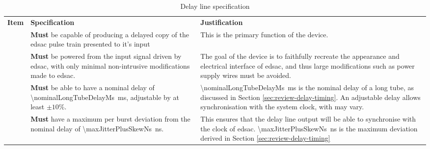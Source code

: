 \begin{longtable}{r  >{\raggedright}p{}  >{\raggedright}p{} }

	\caption{Delay line specification}\label{tbl:spec}\newcounter{specNo}\tabularnewline

	\toprule

	\bfseries Item & \bfseries Specification & \bfseries Justification \tabularnewline

	\midrule

	\endhead %

	\bottomrule

	\endfoot

	
	{specNo}\thespecNo\label{itm:spec-delay} & \textbf{Must} be capable of producing a delayed copy of the \gls{edsac} pulse train presented to it's input & This is the primary function of the device. \tabularnewline
	
	{specNo}\thespecNo\label{itm:spec-power} & \textbf{Must} be powered from the input signal driven by \gls{edsac}, with only minimal non-intrusive modifications made to \gls{edsac}. & The goal of the device is to faithfully recreate the appearance and electrical interface of \gls{edsac}, and thus large modifications such as power supply wires must be avoided. \tabularnewline
	
	{specNo}\thespecNo\label{itm:spec-output-delay} & \textbf{Must} be able to have a nominal delay of \SI{\nominalLongTubeDelayMs}{\milli\second}, adjustable by at least $\pm 10\%$. & \SI{\nominalLongTubeDelayMs}{\milli\second} is the nominal delay of a long tube, as discussed in Section \ref{sec:review-delay-timing}. An adjustable delay allows synchronisation with the system clock, with may vary. \tabularnewline
	
	
	{specNo}\thespecNo\label{itm:spec-skew-jitter} & \textbf{Must} have a maximum per burst deviation from the nominal delay of \SI{\maxJitterPlusSkewNs}{\nano\second}. & This ensures that the delay line output will be able to synchronise with the clock of \gls{edsac}. \SI{\maxJitterPlusSkewNs}{\nano\second} is the maximum deviation derived in Section \ref{sec:review-delay-timing} \tabularnewline
	

\end{longtable}

